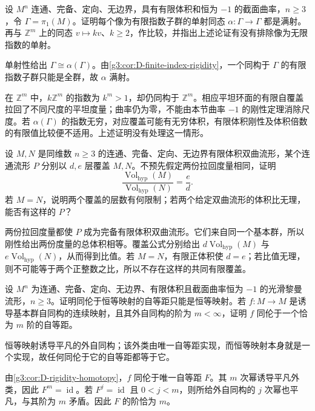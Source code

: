 \begin{exercise}\label{g3:ex:D-finite-index-endomorphism}
	设 \(M^n\) 连通、完备、定向、无边界，具有有限体积和恒为 \(-1\) 的截面曲率，\(n\ge3\)，令 \(\Gamma=\pi_1(M)\)。证明每个像为有限指数子群的单射同态 \(\alpha:\Gamma\to\Gamma\) 都是满射。再与 \(\mathbb Z^m\) 上的同态 \(v\mapsto kv\)、\(k\ge2\)，作比较，并指出上述论证有没有排除像为无限指数的单射。
\end{exercise}
\begin{solution}
	单射性给出 \(\Gamma\cong\alpha(\Gamma)\)。由\cref{g3:cor:D-finite-index-rigidity}，一个同构于 \(\Gamma\) 的有限指数子群只能是全群，故 \(\alpha\) 满射。

	在 \(\mathbb Z^m\) 中，\(k\mathbb Z^m\) 的指数为 \(k^m>1\)，却仍同构于 \(\mathbb Z^m\)。相应平坦环面的有限自覆盖拉回了不同尺度的平坦度量；曲率仍为零，不能由本节曲率 \(-1\) 的刚性定理消除尺度。若 \(\alpha(\Gamma)\) 的指数无穷，对应覆盖可能有无穷体积，有限体积刚性及体积倍数的有限值比较便不适用。上述证明没有处理这一情形。
\end{solution}

\begin{exercise}\label{g3:ex:D-two-cover-degrees}
	设 \(M,N\) 是同维数 \(n\ge3\) 的连通、完备、定向、无边界有限体积双曲流形，某个连通流形 \(P\) 分别以 \(d,e\) 层覆盖 \(M,N\)。不预先假定两份拉回度量相同，证明
	\[
		\frac{\operatorname{Vol}_{\mathrm{hyp}}(M)}
		{\operatorname{Vol}_{\mathrm{hyp}}(N)}=\frac ed.
	\]
	若 \(M=N\)，说明两个覆盖的层数有何限制；若两个给定双曲流形的体积比无理，能否有这样的 \(P\)？
\end{exercise}
\begin{solution}
	两份拉回度量都使 \(P\) 成为完备有限体积双曲流形。它们来自同一个基本群，所以刚性给出两份度量的总体积相等。覆盖公式分别给出 \(d\operatorname{Vol}_{\mathrm{hyp}}(M)\) 与 \(e\operatorname{Vol}_{\mathrm{hyp}}(N)\)，从而得到比值。若 \(M=N\)，有限正体积使 \(d=e\)；若比值无理，则不可能等于两个正整数之比，所以不存在这样的共同有限覆盖。
\end{solution}

\begin{exercise}\label{g3:ex:D-homotopy-trivial-isometry}
	设 \(M^n\) 为连通、完备、定向、无边界、有限体积且截面曲率恒为 \(-1\) 的光滑黎曼流形，\(n\ge3\)。证明同伦于恒等映射的自等距只能是恒等映射。若 \(f:M\to M\) 是诱导基本群自同构的连续映射，且其外自同构的阶为 \(m<\infty\)，证明 \(f\) 同伦于一个恰为 \(m\) 阶的自等距。
\end{exercise}
\begin{solution}
	恒等映射诱导平凡的外自同构；该外类由唯一自等距实现，而恒等映射本身就是一个实现，故任何同伦于它的自等距都等于它。

	由\cref{g3:cor:D-rigidity-homotopy}，\(f\) 同伦于唯一自等距 \(F\)。其 \(m\) 次幂诱导平凡外类，因此 \(F^m=\operatorname{id}\)。若 \(F^j=\operatorname{id}\) 且 \(0<j<m\)，则所给外自同构的 \(j\) 次幂也平凡，与其阶为 \(m\) 矛盾。因此 \(F\) 的阶恰为 \(m\)。
\end{solution}
